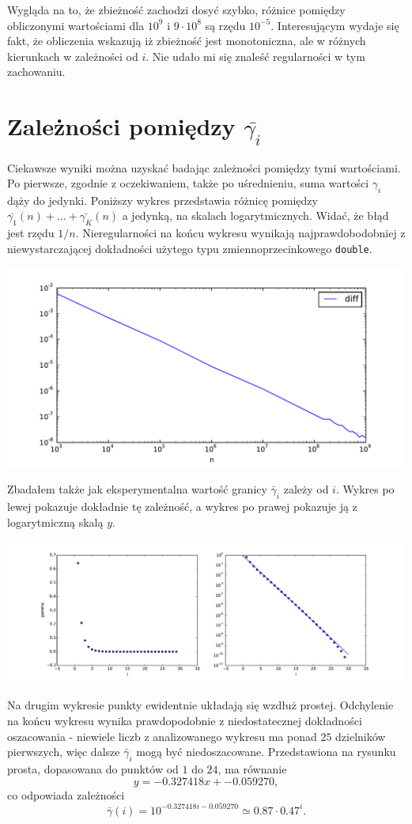 \documentclass{report}
\begin{document}
Wygląda na to, że zbieżność zachodzi dosyć szybko, różnice pomiędzy obliczonymi wartościami dla $10^9$ i $9\cdot 10^8$ są rzędu $10^{-5}$.
Interesującym wydaje się fakt, że obliczenia wskazują iż zbieżność jest monotoniczna, ale w różnych kierunkach w zależności od $i$. Nie udało mi się znaleść regularności w tym zachowaniu.

\section*{Zależności pomiędzy $\bar{\gamma_i}$}

Ciekawsze wyniki można uzyskać badając zależności pomiędzy tymi wartościami. Po pierwsze, zgodnie z oczekiwaniem, także po uśrednieniu, suma wartości $\gamma_i$ dąży do jedynki.
Poniższy wykres przedstawia różnicę pomiędzy $\bar{\gamma_1}(n) + \ldots + \bar{\gamma_K}(n)$ a jedynką, na skalach logarytmicznych. Widać, że błąd jest rzędu $1/n$.
Nieregularności na końcu wykresu wynikają najprawdobodobniej z niewystarczającej dokładności użytego typu zmiennoprzecinkowego \texttt{double}.

\begin{center} \includegraphics[width=0.75 \linewidth]{2} \end{center}

Zbadałem także jak eksperymentalna wartość granicy $\bar{\gamma}_i$ zależy od $i$. Wykres po lewej pokazuje dokładnie tę zależność,
a wykres po prawej pokazuje ją z logarytmiczną skalą $y$.

\begin{center} \includegraphics[width=1 \linewidth]{3} \end{center}

Na drugim wykresie punkty ewidentnie układają się wzdłuż prostej. Odchylenie na końcu wykresu wynika prawdopodobnie z niedostatecznej dokładności oszacowania -
niewiele liczb z analizowanego wykresu ma ponad $25$ dzielników pierwszych, więc dalsze $\bar{\gamma}_i$ mogą być niedoszacowane. Przedstawiona na rysunku prosta,
dopasowana do punktów od $1$ do $24$, ma równanie
$$ y = -0.327418 x + -0.059270, $$
co odpowiada zależności
$$ \bar{\gamma}(i) = 10^{-0.327418 i - 0.059270} \simeq 0.87 \cdot 0.47^i. $$
\end{document}
